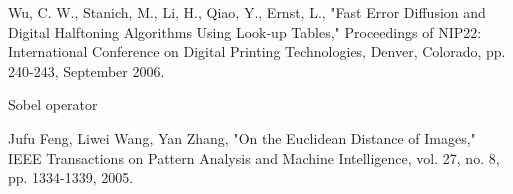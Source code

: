 \documentclass[12pt]{amsart}
\theoremstyle{definition}
\theoremstyle{remark}
\numberwithin{thm}{section}
\begin{document}
\begin{thebibliography}{widest entry}
Wu, C. W., Stanich, M., Li, H., Qiao, Y., Ernst, L., "Fast Error Diffusion and Digital Halftoning Algorithms Using Look-up Tables," Proceedings of NIP22: International Conference on Digital Printing Technologies, Denver, Colorado, pp. 240-243, September 2006.


{Sobel operator}%

Jufu Feng, Liwei Wang, Yan Zhang, "On the Euclidean Distance of Images," IEEE Transactions on Pattern Analysis and Machine Intelligence, vol. 27, no. 8, pp. 1334-1339, 2005.
\end{thebibliography}
 
\end{document}
